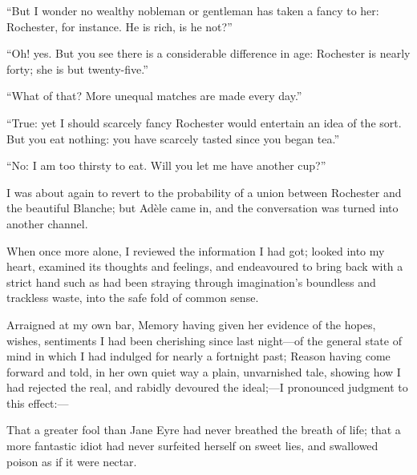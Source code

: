 \enquote{But I wonder no wealthy nobleman or gentleman has taken a fancy
	to her: \Mr{} Rochester, for instance.  He is rich, is he not?}

\enquote{Oh! yes.  But you see there is a considerable difference in
	age: \Mr{} Rochester is nearly forty; she is but twenty-five.}

\enquote{What of that?  More unequal matches are made every day.}

\enquote{True: yet I should scarcely fancy \Mr{} Rochester would entertain
	an idea of the sort.  But you eat nothing: you have scarcely tasted
	since you began tea.}

\enquote{No: I am too thirsty to eat.  Will you let me have another
	cup?}

I was about again to revert to the probability of a union between \Mr{}
Rochester and the beautiful Blanche; but Adèle came in, and the
conversation was turned into another channel.

When once more alone, I reviewed the information I had got; looked into
my heart, examined its thoughts and feelings, and endeavoured to bring
back with a strict hand such as had been straying through imagination's
boundless and trackless waste, into the safe fold of common sense.

Arraigned at my own bar, Memory having given her evidence of the hopes,
wishes, sentiments I had been cherishing since last night---of the
general state of mind in which I had indulged for nearly a fortnight
past; Reason having come forward and told, in her own quiet way a plain,
unvarnished tale, showing how I had rejected the real, and rabidly
devoured the ideal;---I pronounced judgment to this effect:---

That a greater fool than Jane Eyre had never breathed the breath of
life; that a more fantastic idiot had never surfeited herself on sweet
lies, and swallowed poison as if it were nectar.


